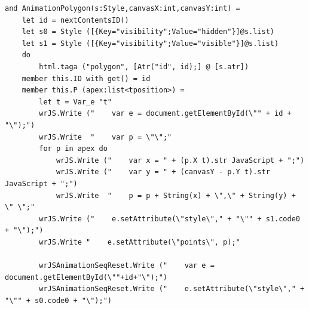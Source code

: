  \begin{lstlisting}[caption={多角形を描画するアニメーション},label={polygon},breaklines=true,breakatwhitespace=false]
and AnimationPolygon(s:Style,canvasX:int,canvasY:int) =
    let id = nextContentsID()
    let s0 = Style ([{Key="visibility";Value="hidden"}]@s.list)
    let s1 = Style ([{Key="visibility";Value="visible"}]@s.list)
    do
        html.taga ("polygon", [Atr("id", id);] @ [s.atr])
    member this.ID with get() = id
    member this.P (apex:list<tposition>) = 
        let t = Var_e "t"
        wrJS.Write ("    var e = document.getElementById(\"" + id + "\");")
        wrJS.Write  "    var p = \"\";"
        for p in apex do
            wrJS.Write ("    var x = " + (p.X t).str JavaScript + ";")
            wrJS.Write ("    var y = " + (canvasY - p.Y t).str JavaScript + ";")
            wrJS.Write  "    p = p + String(x) + \",\" + String(y) + \" \";"
        wrJS.Write ("    e.setAttribute(\"style\"," + "\"" + s1.code0 + "\");")
        wrJS.Write "    e.setAttribute(\"points\", p);"
        
        wrJSAnimationSeqReset.Write ("    var e = document.getElementById(\""+id+"\");")
        wrJSAnimationSeqReset.Write ("    e.setAttribute(\"style\"," + "\"" + s0.code0 + "\");")
\end{lstlisting}
